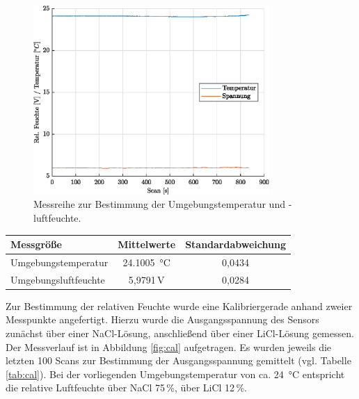\begin{figure}[H]
	\centering
	\includegraphics[width=0.8\textwidth]{../DATA/Messreihe_Umgebung.eps}
	\caption[Messreihe Umgebung]{Messreihe zur Bestimmung der Umgebungstemperatur und -luftfeuchte.}
	\label{fig:amb}
\end{figure}

\begin{center}
	\begin{tabular}{l|c|c}
		\label{tab:amb}
		
		\textbf{Messgröße} & \textbf{Mittelwerte} & \textbf{Standardabweichung}\\
		\hline
		Umgebungstemperatur & \SI{24,1005}{\celsius} & 0,0434\\
		Umgebungsluftfeuchte & 5,9791\,V & 0,0284
	\end{tabular}
\end{center}

Zur Bestimmung der relativen Feuchte wurde eine Kalibriergerade anhand zweier Messpunkte angefertigt. Hierzu wurde die Ausgangsspannung des Sensors zunächst über einer NaCl-Lösung, anschließend über einer LiCl-Lösung gemessen. Der Messverlauf ist in Abbildung \ref{fig:cal} aufgetragen. Es wurden jeweils die letzten 100 Scans zur Bestimmung der Ausgangsspannung gemittelt (vgl. Tabelle \ref{tab:cal}). Bei der vorliegenden Umgebungstemperatur von ca. \SI{24}{\celsius} entspricht die relative Luftfeuchte über NaCl 75\,\%, über LiCl 12\,\%. 

